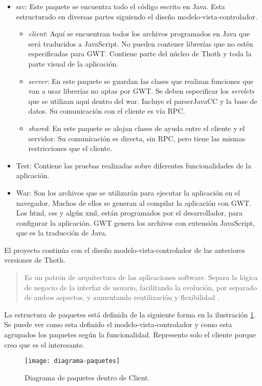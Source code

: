 \begin{itemize}
\item src:
Este paquete se encuentra todo el código escrito en Java. Esta estructurado en diversas partes siguiendo el diseño modelo-vista-controlador.
	\begin{itemize}
	\item \emph{client}: Aquí se encuentran todos los archivos programados en Java que será traducidos a JavaScript. No pueden contener librerías que no estén especificadas para GWT. Contiene parte del núcleo de Thoth y toda la parte visual de la aplicación.
	\item \emph{server}: En este paquete se guardan las clases que realizan funciones que van a usar librerías no aptas por GWT. Se deben especificar los \emph{servlets} que se utilizan aquí dentro del war. Incluye el parserJavaCC y la base de datos. Su comunicación con el cliente es vía RPC.
	\item \emph{shared}: En este paquete se alojan clases de ayuda entre el cliente y el servidor. Su comunicación es directa, sin RPC, pero tiene las mismas restricciones que el cliente.
	\end{itemize}
\item Test: Contiene las pruebas realizadas sobre diferentes funcionalidades de la aplicación.

\item War:
	Son los archivos que se utilizarán para ejecutar la aplicación en el navegador. Muchos de ellos se generan al compilar la aplicación con GWT. Los html, css y algún xml, están programados por el desarrollador, para configurar la aplicación. GWT genera los archivos con extensión JavaScript, que es la traducción de Java.
\end{itemize}


El proyecto continúa con el diseño modelo-vista-controlador de las anteriores versiones de Thoth. 
\begin{quote}
Es un patrón de arquitectura de las aplicaciones software. Separa la lógica de negocio de la interfaz de usuario, facilitando la evolución, por separado de ambos aspectos, y aumentando reutilización y flexibilidad \cite{mvc}.
\end{quote}

La estructura de paquetes está definida de la siguiente forma en la ilustración \ref{fig:4.8}. Se puede ver como esta definido el modelo-vista-controlador y como esta agrupados los paquetes según la funcionalidad. Represento solo el cliente porque creo que es el interesante.

\begin{figure}[h]
\centering
\texttt{[image: diagrama-paquetes]}
\caption{Diagrama de paquetes dentro de Client.}
\label{fig:4.8}
\end{figure}